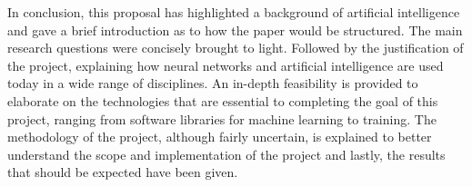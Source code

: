 
In conclusion, this proposal has highlighted a background of artificial intelligence and gave a brief introduction as to how the paper would be structured. The main research questions were concisely brought to light. Followed by the justification of the project, explaining how neural networks and artificial intelligence are used today in a wide range of disciplines.
An in-depth feasibility is provided to elaborate on the technologies that are essential to completing the goal of this project, ranging from software libraries for machine learning to training. The methodology of the project, although fairly uncertain, is explained to better understand the scope and implementation of the project and lastly, the results that should be expected have been given. 

